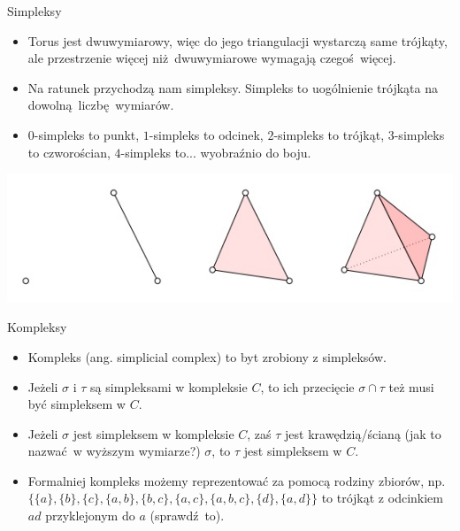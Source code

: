 \documentclass{beamer}
\begin{document}
\begin{frame}{Simpleksy}

\begin{itemize}
	\item Torus jest dwuwymiarowy, więc do jego triangulacji wystarczą same trójkąty, ale przestrzenie więcej niż dwuwymiarowe wymagają czegoś więcej.
	\item Na ratunek przychodzą nam simpleksy. Simpleks to uogólnienie trójkąta na dowolną liczbę wymiarów.
	\item $0$-simpleks to punkt, $1$-simpleks to odcinek, $2$-simpleks to trójkąt, $3$-simpleks to czworościan, $4$-simpleks to... wyobraźnio do boju.
\end{itemize}

\begin{center}
\includegraphics[scale = 0.6]{Simpleksy.jpg}
\end{center}

\end{frame}

\begin{frame}{Kompleksy}
\begin{itemize}
	\item Kompleks (ang. simplicial complex) to byt zrobiony z simpleksów.
	\item Jeżeli $\sigma$ i $\tau$ są simpleksami w kompleksie $C$, to ich przecięcie $\sigma \cap \tau$ też musi być simpleksem w $C$.
	\item Jeżeli $\sigma$ jest simpleksem w kompleksie $C$, zaś $\tau$ jest krawędzią/ścianą (jak to nazwać w wyższym wymiarze?) $\sigma$, to $\tau$ jest simpleksem w $C$.
	\item Formalniej kompleks możemy reprezentować za pomocą rodziny zbiorów, np. $\{\{a\}, \{b\}, \{c\}, \{a, b\}, \{b, c\}, \{a, c\}, \{a, b, c\}, \{d\}, \{a, d\}\}$ to trójkąt z odcinkiem $ad$ przyklejonym do $a$ (sprawdź to).
\end{itemize}
\end{frame}
\end{document}
